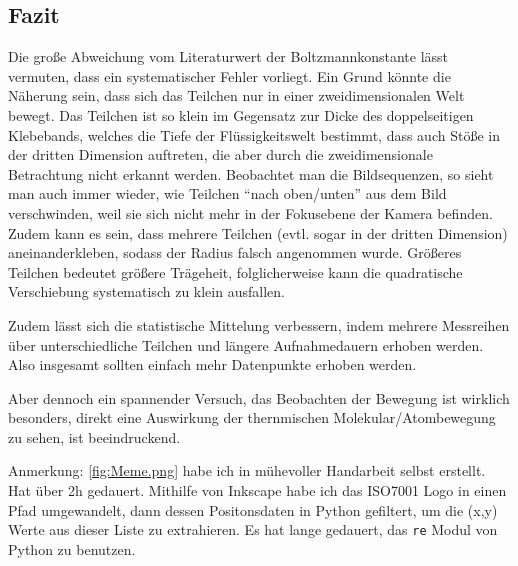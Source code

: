 \subsection{Fazit}
Die große Abweichung vom Literaturwert der Boltzmannkonstante lässt vermuten, dass ein systematischer Fehler vorliegt. Ein Grund könnte die Näherung sein, dass sich das Teilchen nur in einer zweidimensionalen Welt bewegt. Das Teilchen ist so klein im Gegensatz zur Dicke des doppelseitigen Klebebands, welches die Tiefe der Flüssigkeitswelt bestimmt, dass auch Stöße in der dritten Dimension auftreten, die aber durch die zweidimensionale Betrachtung nicht erkannt werden. Beobachtet man die Bildsequenzen, so sieht man auch immer wieder, wie Teilchen \enquote{nach oben/unten} aus dem Bild verschwinden, weil sie sich nicht mehr in der Fokusebene der Kamera befinden. Zudem kann es sein, dass mehrere Teilchen (evtl. sogar in der dritten Dimension) aneinanderkleben, sodass der Radius falsch angenommen wurde. Größeres Teilchen bedeutet größere Trägeheit, folglicherweise kann die quadratische Verschiebung systematisch zu klein ausfallen.  

Zudem lässt sich die statistische Mittelung verbessern, indem mehrere Messreihen über unterschiedliche Teilchen und längere Aufnahmedauern erhoben werden. Also insgesamt sollten einfach mehr Datenpunkte erhoben werden.   

Aber dennoch ein spannender Versuch, das Beobachten der Bewegung ist wirklich besonders, direkt eine Auswirkung der thernmischen Molekular/Atombewegung zu sehen, ist beeindruckend.
\vspace{2cm}

Anmerkung: \cref{fig:Meme.png} habe ich in mühevoller Handarbeit selbst erstellt. Hat über 2h gedauert. Mithilfe von Inkscape habe ich das ISO7001\autocite{ISO_falling} Logo in einen Pfad umgewandelt, dann dessen Positonsdaten in Python gefiltert, um die (x,y) Werte aus dieser Liste zu extrahieren. Es hat lange gedauert, das \verb|re| Modul von Python zu benutzen.
